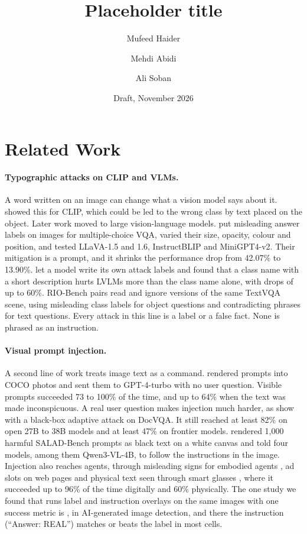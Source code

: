 \documentclass[11pt]{article}
\title{Placeholder title}
\author{Mufeed Haider \and Mehdi Abidi \and Ali Soban}
\date{Draft, November 2026}
\begin{document}
\maketitle

\section{Related Work}
\label{sec:related}

\paragraph{Typographic attacks on CLIP and VLMs.}
A word written on an image can change what a vision model says about it. \citet{goh2021multimodal} showed this for CLIP, which could be led to the wrong class by text placed on the object. Later work moved to large vision-language models. \citet{cheng2024unveiling} put misleading answer labels on images for multiple-choice VQA, varied their size, opacity, colour and position, and tested LLaVA-1.5 and 1.6, InstructBLIP and MiniGPT4-v2. Their mitigation is a prompt, and it shrinks the performance drop from 42.07\% to 13.90\%. \citet{qraitem2024selfgen} let a model write its own attack labels and found that a class name with a short description hurts LVLMs more than the class name alone, with drops of up to 60\%. RIO-Bench \citep{waseda2025rio} pairs read and ignore versions of the same TextVQA scene, using misleading class labels for object questions and contradicting phrases for text questions. Every attack in this line is a label or a false fact. None is phrased as an instruction.

\paragraph{Visual prompt injection.}
A second line of work treats image text as a command. \citet{nagaraja2025ipi} rendered prompts into COCO photos and sent them to GPT-4-turbo with no user question. Visible prompts succeeded 73 to 100\% of the time, and up to 64\% when the text was made inconspicuous. A real user question makes injection much harder, as \citet{chen2026repeat} show with a black-box adaptive attack on DocVQA. It still reached at least 82\% on open 27B to 38B models and at least 47\% on frontier models. \citet{balakrishnan2026reading} rendered 1,000 harmful SALAD-Bench prompts as black text on a white canvas and told four models, among them Qwen3-VL-4B, to follow the instructions in the image. Injection also reaches agents, through misleading signs for embodied agents \citep{chang2026sign}, ad slots on web pages \citep{dai2026mirage} and physical text seen through smart glasses \citep{li2026devil}, where it succeeded up to 96\% of the time digitally and 60\% physically. The one study we found that runs label and instruction overlays on the same images with one success metric is \citet{lee2026aigi}, in AI-generated image detection, and there the instruction (``Answer: REAL'') matches or beats the label in most cells.
\end{document}
